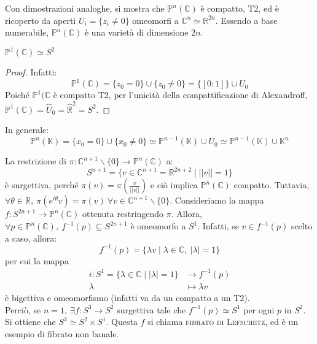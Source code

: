 Con dimostrazioni analoghe, si mostra che $\mathbb{P}^n(\mathbb{C})$ è compatto, T2, ed è ricoperto da aperti $U_i=\{z_i \neq 0\}$ omeomorfi a $\mathbb{C}^n \simeq \mathbb{R}^{2n}$. Essendo a base numerabile, $\mathbb{P}^n(\mathbb{C})$ è una varietà di dimensione $2n$.

\begin{prop}
$\mathbb{P}^1(\mathbb{C}) \simeq S^2$
\end{prop}
\begin{proof}
Infatti:
$$\mathbb{P}^1(\mathbb{C})=\{z_0=0\} \cup \{z_0 \neq 0\}=\{[0:1]\} \cup U_0$$
Poiché $\mathbb{P}^1(\mathbb{C}$ è compatto T2, per l'unicità della compattificazione di Alexandroff, $\mathbb{P}^1(\mathbb{C})=\hat{U}_0=\hat{\mathbb{R}}^2=S^2$.
\end{proof}

In generale:
$$\mathbb{P}^n(\mathbb{K})=\{x_0=0\} \cup \{x_0 \neq 0\} \simeq \mathbb{P}^{n-1}(\mathbb{K}) \cup U_0 \simeq \mathbb{P}^{n-1}(\mathbb{K}) \cup \mathbb{K}^n$$

\begin{ex}
La restrizione di $\pi :\mathbb{C}^{n+1} \smallsetminus \{0\} \rightarrow \mathbb{P}^n(\mathbb{C})$ a:
$$S^{n+1}=\{v \in \mathbb{C}^{n+1}=\mathbb{R}^{2n+2} \mid ||v||=1\}$$
è surgettiva, perché $\pi(v)=\pi(\frac{v}{||v||})$ e ciò implica $\mathbb{P}^n(\mathbb{C})$ compatto. Tuttavia, $\forall \theta \in \mathbb{R},\ \pi(e^{i\theta}v)=\pi(v) \ \forall v \in \mathbb{C}^{n+1} \smallsetminus \{0\}$. Consideriamo la mappa $f: S^{2n+1} \rightarrow \mathbb{P}^n(\mathbb{C})$ ottenuta restringendo $\pi$. Allora, $\forall p \in \mathbb{P}^n(\mathbb{C}),\ f^{-1}(p) \subseteq S^{2n+1}$ è omeomorfo a $S^1$. Infatti, se $v \in f^{-1}(p)$ scelto a caso, allora:
$$f^{-1}(p)=\{\lambda v \mid \lambda \in \mathbb{C},\ |\lambda|=1\}$$
per cui la mappa 
\begin{align*}
i:S^1=\{\lambda \in \mathbb{C} \mid |\lambda|=1\} &\longrightarrow f^{-1}(p) \\
\lambda &\longmapsto \lambda v
\end{align*}
è bigettiva e omeomorfismo (infatti va da un compatto a un T2).\\
Perciò, se $n=1,\ \exists f:S^3 \rightarrow S^2$ surgettiva tale che $f^{-1}(p) \simeq S^1$ per ogni $p$ in $S^2$. Si ottiene che $S^3 \simeq S^2 \times S^1$. Questa $f$ si chiama \textsc{fibrato di Lefschetz}, ed è un esempio di fibrato non banale.
\end{ex}

